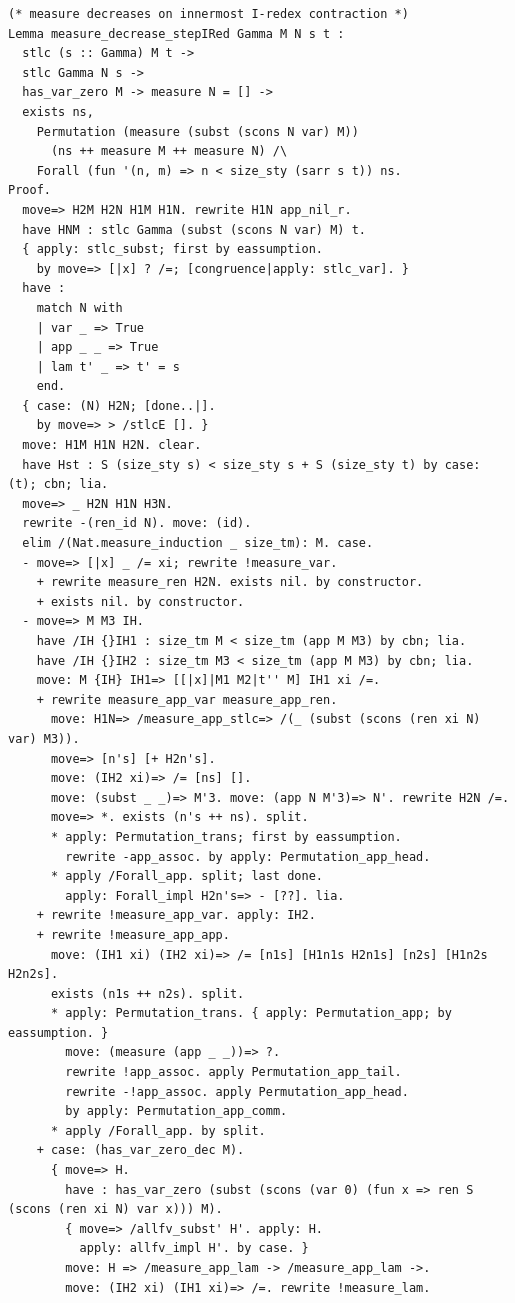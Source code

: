\begin{lstlisting}[style=authorcoq]
(* measure decreases on innermost I-redex contraction *)
Lemma measure_decrease_stepIRed Gamma M N s t :
  stlc (s :: Gamma) M t ->
  stlc Gamma N s ->
  has_var_zero M -> measure N = [] ->
  exists ns,
    Permutation (measure (subst (scons N var) M))
      (ns ++ measure M ++ measure N) /\
    Forall (fun '(n, m) => n < size_sty (sarr s t)) ns.
Proof.
  move=> H2M H2N H1M H1N. rewrite H1N app_nil_r.
  have HNM : stlc Gamma (subst (scons N var) M) t.
  { apply: stlc_subst; first by eassumption.
    by move=> [|x] ? /=; [congruence|apply: stlc_var]. }
  have :
    match N with
    | var _ => True
    | app _ _ => True
    | lam t' _ => t' = s
    end.
  { case: (N) H2N; [done..|].
    by move=> > /stlcE []. }
  move: H1M H1N H2N. clear.
  have Hst : S (size_sty s) < size_sty s + S (size_sty t) by case: (t); cbn; lia.
  move=> _ H2N H1N H3N.
  rewrite -(ren_id N). move: (id).
  elim /(Nat.measure_induction _ size_tm): M. case.
  - move=> [|x] _ /= xi; rewrite !measure_var.
    + rewrite measure_ren H2N. exists nil. by constructor.
    + exists nil. by constructor.
  - move=> M M3 IH.
    have /IH {}IH1 : size_tm M < size_tm (app M M3) by cbn; lia.
    have /IH {}IH2 : size_tm M3 < size_tm (app M M3) by cbn; lia.
    move: M {IH} IH1=> [[|x]|M1 M2|t'' M] IH1 xi /=.
    + rewrite measure_app_var measure_app_ren.
      move: H1N=> /measure_app_stlc=> /(_ (subst (scons (ren xi N) var) M3)).
      move=> [n's] [+ H2n's].
      move: (IH2 xi)=> /= [ns] [].
      move: (subst _ _)=> M'3. move: (app N M'3)=> N'. rewrite H2N /=.
      move=> *. exists (n's ++ ns). split.
      * apply: Permutation_trans; first by eassumption.
        rewrite -app_assoc. by apply: Permutation_app_head.
      * apply /Forall_app. split; last done.
        apply: Forall_impl H2n's=> - [??]. lia.
    + rewrite !measure_app_var. apply: IH2.
    + rewrite !measure_app_app.
      move: (IH1 xi) (IH2 xi)=> /= [n1s] [H1n1s H2n1s] [n2s] [H1n2s H2n2s].
      exists (n1s ++ n2s). split.
      * apply: Permutation_trans. { apply: Permutation_app; by eassumption. }
        move: (measure (app _ _))=> ?.
        rewrite !app_assoc. apply Permutation_app_tail.
        rewrite -!app_assoc. apply Permutation_app_head.
        by apply: Permutation_app_comm.
      * apply /Forall_app. by split.
    + case: (has_var_zero_dec M).
      { move=> H.
        have : has_var_zero (subst (scons (var 0) (fun x => ren S (scons (ren xi N) var x))) M).
        { move=> /allfv_subst' H'. apply: H.
          apply: allfv_impl H'. by case. }
        move: H => /measure_app_lam -> /measure_app_lam ->.
        move: (IH2 xi) (IH1 xi)=> /=. rewrite !measure_lam.

\end{lstlisting}
